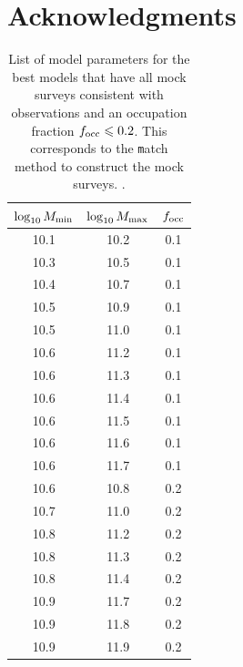 \documentclass[usenatbib]{mn2e}
\begin{document}
\section*{Acknowledgments} 


\begin{table}
\begin{center}
\begin{tabular}{ccc}\hline\hline
$\log_{10}M_{\rm min}$ & $\log_{10}M_{\rm max}$ & $f_{\rm occ}$\\\hline
10.1& 10.2& 0.1\\
10.3& 10.5& 0.1\\
10.4& 10.7& 0.1\\
10.5& 10.9& 0.1\\
10.5& 11.0& 0.1\\
10.6& 11.2& 0.1\\
10.6& 11.3& 0.1\\
10.6& 11.4& 0.1\\
10.6& 11.5& 0.1\\
10.6& 11.6& 0.1\\
10.6& 11.7& 0.1\\
10.6& 10.8& 0.2\\
10.7& 11.0& 0.2\\
10.8& 11.2& 0.2\\
10.8& 11.3& 0.2\\
10.8& 11.4& 0.2\\
10.9& 11.7& 0.2\\
10.9& 11.8& 0.2\\
10.9& 11.9& 0.2\\
\end{tabular}
\end{center}
\caption{List of model parameters for the best models that have all
  mock surveys consistent with observations and an occupation
  fraction $f_{\rm occ}\leq 0.2$. This corresponds to the {\texttt
    match} method to construct the mock surveys. \label{table:models_match}. }
\end{table}


 
\end{document}
